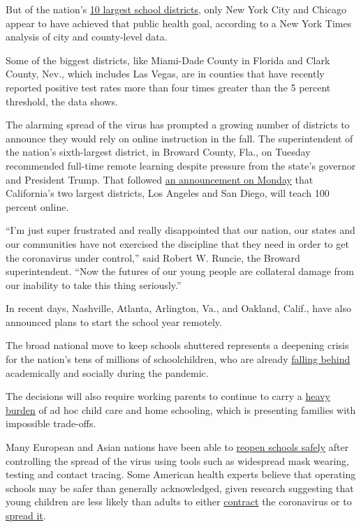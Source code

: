 But of the nation's
\href{https://nces.ed.gov/programs/digest/d17/tables/dt17_215.30.asp}{10
largest school districts}, only New York City and Chicago appear to have
achieved that public health goal, according to a New York Times analysis
of city and county-level data.

Some of the biggest districts, like Miami-Dade County in Florida and
Clark County, Nev., which includes Las Vegas, are in counties that have
recently reported positive test rates more than four times greater than
the 5 percent threshold, the data shows.

The alarming spread of the virus has prompted a growing number of
districts to announce they would rely on online instruction in the fall.
The superintendent of the nation's sixth-largest district, in Broward
County, Fla., on Tuesday recommended full-time remote learning despite
pressure from the state's governor and President Trump. That followed
\href{https://www.nytimes.com/2020/07/13/us/lausd-san-diego-school-reopening.html}{an
announcement on Monday} that California's two largest districts, Los
Angeles and San Diego, will teach 100 percent online.

``I'm just super frustrated and really disappointed that our nation, our
states and our communities have not exercised the discipline that they
need in order to get the coronavirus under control,'' said Robert W.
Runcie, the Broward superintendent. ``Now the futures of our young
people are collateral damage from our inability to take this thing
seriously.''

In recent days, Nashville, Atlanta, Arlington, Va., and Oakland, Calif.,
have also announced plans to start the school year remotely.

The broad national move to keep schools shuttered represents a deepening
crisis for the nation's tens of millions of schoolchildren, who are
already
\href{https://www.nytimes.com/2020/06/05/us/coronavirus-education-lost-learning.html}{falling
behind} academically and socially during the pandemic.

The decisions will also require working parents to continue to carry a
\href{https://www.nytimes.com/2020/07/10/nyregion/nyc-school-daycare-reopening.html}{heavy
burden} of ad hoc child care and home schooling, which is presenting
families with impossible trade-offs.

Many European and Asian nations have been able to
\href{https://www.nytimes.com/2020/07/11/health/coronavirus-schools-reopen.html}{reopen
schools safely} after controlling the spread of the virus using tools
such as widespread mask wearing, testing and contact tracing. Some
American health experts believe that operating schools may be safer than
generally acknowledged, given research suggesting that young children
are less likely than adults to either
\href{https://pubmed.ncbi.nlm.nih.gov/32546824/}{contract} the
coronavirus or to
\href{https://pediatrics.aappublications.org/content/early/2020/07/08/peds.2020-004879}{spread
it}.

